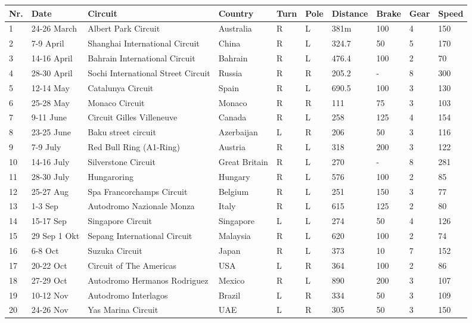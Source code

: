 \documentclass{article}
\begin{document}
\begin{tabularx}{.6\textwidth}{Xlllllllll}
Nr.	& Date	       & Circuit	                          & Country    & Turn & Pole  &Distance &Brake &Gear &Speed\\
\hline
1	  & 24-26 March	 & Albert Park Circuit	              & Australia  & R&L       & 381m &100 & 4 & 150\\
2	  & 7-9 April	   & Shanghai International Circuit     & China      & R&L       & 324.7 &50 & 5 & 170\\
3	  & 14-16 April	 & Bahrain International Circuit	    & Bahrain    & R&L       & 476.4 &100 & 2 & 70\\
4	  & 28-30 April	 & Sochi International Street Circuit & Russia     & R&R       & 205.2 &- & 8 & 300\\
5	  & 12-14 May	   & Catalunya Circuit	                & Spain      & R&L       & 690.5 &100 & 3 & 130\\
6	  & 25-28 May	   & Monaco Circuit	                    & Monaco     & R&R       & 111 &75 & 3 & 103\\
7	  & 9-11 June	   & Circuit Gilles Villeneuve	        & Canada     & R&L       & 258 &125 & 4 & 154 \\
8	  & 23-25 June	 & Baku street circuit	              & Azerbaijan & L&R       & 206 &50 & 3 & 116\\
9	  & 7-9 July	   & Red Bull Ring (A1-Ring)	          & Austria    & R&L       & 318 &200 & 3 & 122\\
10	& 14-16 July	 & Silverstone Circuit	              & Great Britain & R&L    & 270 &- & 8 & 281\\
11	& 28-30 July	 & Hungaroring	                      & Hungary    & R&L       & 576 &100 & 2 & 85\\
12	& 25-27 Aug	   & Spa Francorchamps Circuit	        & Belgium    & R&L       & 251 &150 & 3 & 77\\
13	& 1-3 Sep	     & Autodromo Nazionale Monza	        & Italy      & R&L       & 615 &125 & 2 & 80\\
14	& 15-17 Sep	   & Singapore Circuit	                & Singapore  & L&L       & 274 &50 & 4 & 126\\
15	& 29 Sep 1 Okt & Sepang International Circuit	      & Malaysia   & R&L       & 620 &100 & 2 & 74\\
16	& 6-8 Oct	     & Suzuka Circuit	                    & Japan      & R&L       & 373 &10 & 7 & 152\\
17	& 20-22 Oct	   & Circuit of The Americas	          & USA        & L&R       & 364 &100 & 2 & 86\\
18	& 27-29 Oct	   & Autodromo Hermanos Rodriguez	      & Mexico     & R&L       & 890 &200 & 3 & 107\\
19	& 10-12 Nov	   & Autodromo Interlagos	              & Brazil     & L&R       & 334 &50 & 3 & 109\\
20	& 24-26 Nov	   & Yas Marina Circuit	                & UAE        & L&R       & 305 &50 & 3 & 150\\
\end{tabularx}
\end{document}
